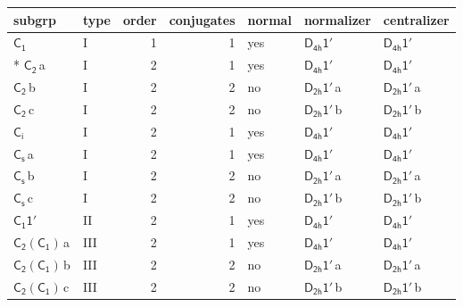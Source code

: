 \documentclass[10pt,a4paper]{article}
\numberwithin{equation}{section}
\newcommand{\grp}[1]{\mathsf{#1}}
\newcommand{\clsletter}[1]{\,{\scriptsize\color{black!55}#1}}
\begin{document}
{\small\begin{longtable}{@{}llrrlll@{}}\toprule
subgrp & type & order & conjugates & normal & normalizer & centralizer\\\midrule\endhead
\bottomrule\endfoot\endlastfoot
\href{../../../rotation/data/pdf/C1.pdf}{$\grp{C_{1}}$} & I & 1 & 1 & yes & \href{D4h-1p.pdf}{$\grp{D_{4h}1'}$} & \href{D4h-1p.pdf}{$\grp{D_{4h}1'}$}\\*
\href{../../../rotation/data/pdf/C2.pdf}{$\grp{C_{2}}$}\clsletter{a} & I & 2 & 1 & yes & \href{D4h-1p.pdf}{$\grp{D_{4h}1'}$} & \href{D4h-1p.pdf}{$\grp{D_{4h}1'}$}\\
\href{../../../rotation/data/pdf/C2.pdf}{$\grp{C_{2}}$}\clsletter{b} & I & 2 & 2 & no & \href{D2h-1p.pdf}{$\grp{D_{2h}1'}$}\clsletter{a} & \href{D2h-1p.pdf}{$\grp{D_{2h}1'}$}\clsletter{a}\\
\href{../../../rotation/data/pdf/C2.pdf}{$\grp{C_{2}}$}\clsletter{c} & I & 2 & 2 & no & \href{D2h-1p.pdf}{$\grp{D_{2h}1'}$}\clsletter{b} & \href{D2h-1p.pdf}{$\grp{D_{2h}1'}$}\clsletter{b}\\
\href{../../../rotation/data/pdf/S2.pdf}{$\grp{C_{i}}$} & I & 2 & 1 & yes & \href{D4h-1p.pdf}{$\grp{D_{4h}1'}$} & \href{D4h-1p.pdf}{$\grp{D_{4h}1'}$}\\
\href{../../../rotation/data/pdf/C1v.pdf}{$\grp{C_{s}}$}\clsletter{a} & I & 2 & 1 & yes & \href{D4h-1p.pdf}{$\grp{D_{4h}1'}$} & \href{D4h-1p.pdf}{$\grp{D_{4h}1'}$}\\
\href{../../../rotation/data/pdf/C1v.pdf}{$\grp{C_{s}}$}\clsletter{b} & I & 2 & 2 & no & \href{D2h-1p.pdf}{$\grp{D_{2h}1'}$}\clsletter{a} & \href{D2h-1p.pdf}{$\grp{D_{2h}1'}$}\clsletter{a}\\
\href{../../../rotation/data/pdf/C1v.pdf}{$\grp{C_{s}}$}\clsletter{c} & I & 2 & 2 & no & \href{D2h-1p.pdf}{$\grp{D_{2h}1'}$}\clsletter{b} & \href{D2h-1p.pdf}{$\grp{D_{2h}1'}$}\clsletter{b}\\
\href{C1-1p.pdf}{$\grp{C_{1}1'}$} & II & 2 & 1 & yes & \href{D4h-1p.pdf}{$\grp{D_{4h}1'}$} & \href{D4h-1p.pdf}{$\grp{D_{4h}1'}$}\\
\href{C2-C1.pdf}{$\grp{C_{2}}(\grp{C_{1}})$}\clsletter{a} & III & 2 & 1 & yes & \href{D4h-1p.pdf}{$\grp{D_{4h}1'}$} & \href{D4h-1p.pdf}{$\grp{D_{4h}1'}$}\\
\href{C2-C1.pdf}{$\grp{C_{2}}(\grp{C_{1}})$}\clsletter{b} & III & 2 & 2 & no & \href{D2h-1p.pdf}{$\grp{D_{2h}1'}$}\clsletter{a} & \href{D2h-1p.pdf}{$\grp{D_{2h}1'}$}\clsletter{a}\\
\href{C2-C1.pdf}{$\grp{C_{2}}(\grp{C_{1}})$}\clsletter{c} & III & 2 & 2 & no & \href{D2h-1p.pdf}{$\grp{D_{2h}1'}$}\clsletter{b} & \href{D2h-1p.pdf}{$\grp{D_{2h}1'}$}\clsletter{b}\\

\end{longtable}}
\end{document}
